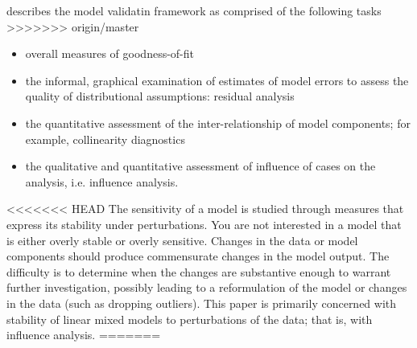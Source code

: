 \documentclass[12pt, a4paper]{article}
\begin{document}
\citet{schab} describes the model validatin framework as comprised of the following tasks
>>>>>>> origin/master
\begin{itemize}
	\item  overall measures of goodness-of-fit
	\item the informal, graphical examination of estimates of model errors to assess the quality of distributional
	assumptions: residual analysis
	
	
	\item the quantitative assessment of the inter-relationship of model components; for example, collinearity 	diagnostics
	\item the qualitative and quantitative assessment of influence of cases on the analysis, i.e. influence analysis.
\end{itemize}
<<<<<<< HEAD
The sensitivity of a model is studied through measures that express its stability under perturbations. You
are not interested in a model that is either overly stable or overly sensitive. Changes in the data or model
components should produce commensurate changes in the model output. The difficulty is to determine
when the changes are substantive enough to warrant further investigation, possibly leading to a reformulation
of the model or changes in the data (such as dropping outliers). This paper is primarily concerned
with stability of linear mixed models to perturbations of the data; that is, with influence analysis. 
=======

\end{document}
